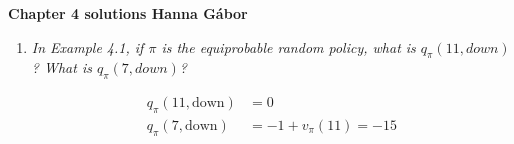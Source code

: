 \documentclass[12pt,a4paper]{article}
\begin{document}
\textbf{Chapter 4 solutions  \hfill Hanna Gábor}

\begin{enumerate}
  \item
   \textit{In Example 4.1, if $\pi$ is the equiprobable random policy, what is $q_\pi(11, down)$?
   What is $q_\pi(7, down)$?}

   \begin{align*}
   q_\pi(11, \text{down}) &= 0\\
   q_\pi(7, \text{down}) &= -1 + v_\pi(11) = -15\\
   \end{align*}

\end{enumerate}
\end{document}
